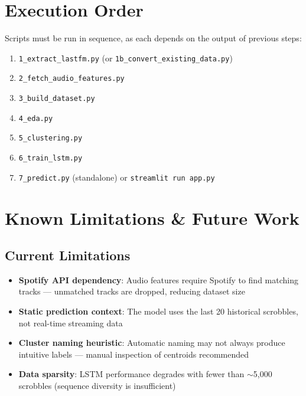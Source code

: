 \documentclass[12pt, a4paper]{article}
\begin{document}
\section{Execution Order}

Scripts must be run in sequence, as each depends on the output of previous steps:

\begin{enumerate}
    \item \texttt{1\_extract\_lastfm.py} (or \texttt{1b\_convert\_existing\_data.py})
    \item \texttt{2\_fetch\_audio\_features.py}
    \item \texttt{3\_build\_dataset.py}
    \item \texttt{4\_eda.py}
    \item \texttt{5\_clustering.py}
    \item \texttt{6\_train\_lstm.py}
    \item \texttt{7\_predict.py} (standalone) or \texttt{streamlit run app.py}
\end{enumerate}

\section{Known Limitations \& Future Work}

\subsection{Current Limitations}
\begin{itemize}
    \item \textbf{Spotify API dependency}: Audio features require Spotify to find matching tracks — unmatched tracks are dropped, reducing dataset size
    \item \textbf{Static prediction context}: The model uses the last 20 historical scrobbles, not real-time streaming data
    \item \textbf{Cluster naming heuristic}: Automatic naming may not always produce intuitive labels — manual inspection of centroids recommended
    \item \textbf{Data sparsity}: LSTM performance degrades with fewer than $\sim$5,000 scrobbles (sequence diversity is insufficient)
\end{itemize}
\end{document}
